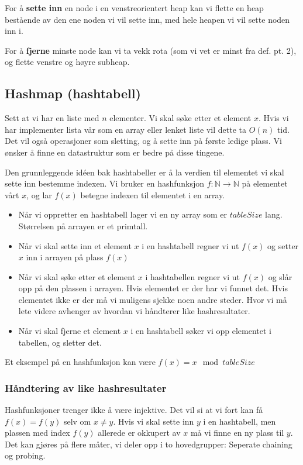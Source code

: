 For å \textbf{sette inn} en node i en venstreorientert heap kan vi flette en heap bestående av den ene noden vi vil sette inn, med hele heapen vi vil sette noden inn i.

For å \textbf{fjerne} minste node kan vi ta vekk rota (som vi vet er minst fra def. pt. 2), og flette venstre og høyre subheap.





\subsection{Hashmap (hashtabell)} \label{hashmap}
Sett at vi har en liste med $ n $ elementer. Vi skal søke etter et element $ x $. Hvis vi har implementer lista vår som en array eller lenket liste vil dette ta $ O(n) $ tid. Det vil også operasjoner som sletting, og å sette inn på første ledige plass. Vi ønsker å finne en datastruktur som er bedre på disse tingene. 

Den grunnleggende idéen bak hashtabeller er å la verdien til elementet vi skal sette inn bestemme indexen. Vi bruker en hashfunksjon $ f:\mathbb{N}\rightarrow\mathbb{N} $ på elementet vårt $ x $, og lar $ f(x) $ betegne indexen til elementet i en array. 

\begin{itemize}
\item Når vi oppretter en hashtabell lager vi en ny array som er $ tableSize $ lang. Størrelsen på arrayen er et primtall. 
\item Når vi skal sette inn et element $ x $ i en hashtabell regner vi ut $ f(x) $ og setter $ x $ inn i arrayen på plass $ f(x) $
\item Når vi skal søke etter et element $ x $ i hashtabellen regner vi ut $ f(x) $ og slår opp på den plassen i arrayen. Hvis elementet er der har vi funnet det. Hvis elementet ikke er der må vi muligens sjekke noen andre steder. Hvor vi må lete videre avhenger av hvordan vi håndterer like hashresultater. 
\item Når vi skal fjerne et element $ x $ i en hashtabell søker vi opp elementet i tabellen, og sletter det. 
\end{itemize}

\noindent Et eksempel på en hashfunksjon kan være $ f(x) = x \mod tableSize $


\subsubsection{Håndtering av like hashresultater}
Hashfunksjoner trenger ikke å være injektive. Det vil si at vi fort kan få $ f(x) = f(y) $ selv om $ x \neq y $. Hvis vi skal sette inn $ y $ i en hashtabell, men plassen med index $ f(y) $ allerede er okkupert av $ x $ må vi finne en ny plass til $ y $. Det kan gjøres på flere måter, vi deler opp i to hovedgrupper: Seperate chaining og probing. 


